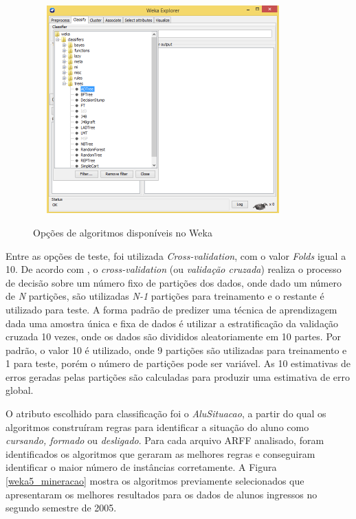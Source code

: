    \begin{figure}[!h]
   	\centering
   	{\includegraphics[width=10cm, height=8cm]{images/classificador2}}
   	\caption {Opções de algoritmos disponíveis no Weka}
   	\label{classificador2}
   \end{figure}

Entre as opções de teste, foi utilizada \textit{Cross-validation}, com o valor \textit{Folds} igual a 10. De acordo com \citet{witten2005}, o \textit{cross-validation} (ou \textit{validação cruzada}) realiza o processo de decisão sobre um número fixo de partições dos dados, onde dado um número de \textit{N} partições, são utilizadas \textit{N-1} partições para treinamento e o restante é utilizado para teste. A forma padrão de predizer uma técnica de aprendizagem dada uma amostra única e fixa de dados é utilizar a estratificação da validação cruzada 10 vezes, onde os dados são divididos aleatoriamente em 10 partes. Por padrão, o valor 10 é utilizado, onde 9 partições são utilizadas para treinamento e 1 para teste, porém o número de partições pode ser variável. As 10 estimativas de erros geradas pelas partições são calculadas para produzir uma estimativa de erro global.

O atributo escolhido para classificação foi o \textit{AluSituacao}, a partir do qual os algoritmos construíram regras para identificar a situação do aluno como \textit{cursando, formado} ou \textit{desligado}. Para cada arquivo ARFF analisado, foram identificados os algoritmos que geraram as melhores regras e conseguiram identificar o maior número de instâncias corretamente. A Figura \ref{weka5_mineracao} mostra os algoritmos previamente selecionados que apresentaram os melhores resultados para os dados de alunos ingressos no segundo semestre de 2005.

